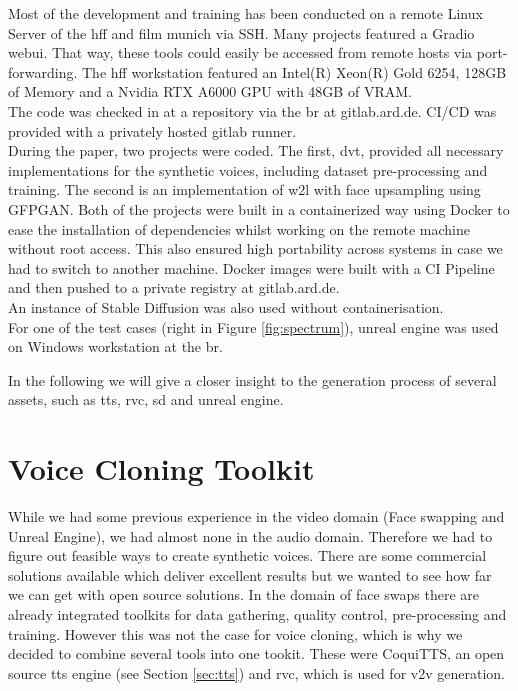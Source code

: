 \documentclass[
  a4paper,  %
  twoside,  %
  bibliography=totoc,
  headsepline,
  cleardoublepage=empty,
  parskip=half,
  draft=false
]{scrbook}
\begin{document}
Most of the development and training has been conducted on a remote Linux Server of the \gls{hff} and film munich via SSH. Many projects featured a Gradio webui. That way, these tools could easily be accessed from remote hosts via port-forwarding. The \gls{hff} workstation featured an Intel(R) Xeon(R) Gold 6254, 128GB of Memory and a Nvidia RTX A6000 GPU with 48GB of VRAM. \\
The code was checked in at a repository via the \gls{br} at gitlab.ard.de. CI/CD was provided with a privately hosted gitlab runner. \\
During the paper, two projects were coded. The first, \gls{dvt}, provided all necessary implementations for the synthetic voices, including dataset pre-processing and training. The second is an implementation of \gls{w2l} with face upsampling using GFPGAN. Both of the projects were built in a containerized way using Docker to ease the installation of dependencies whilst working on the remote machine without root access. This also ensured high portability across systems in case we had to switch to another machine. Docker images were built with a CI Pipeline and then pushed to a private registry at gitlab.ard.de. \\
An instance of Stable Diffusion was also used without containerisation.  \\
For one of the test cases (right in Figure \ref{fig:spectrum}), unreal engine was used on Windows workstation at the \gls{br}.

In the following we will give a closer insight to the generation process of several assets, such as \gls{tts}, \gls{rvc}, \gls{sd} and unreal engine.

\section{Voice Cloning Toolkit}
\label{sec:dvt}
While we had some previous experience in the video domain (Face swapping and Unreal Engine), we had almost none in the audio domain. Therefore we had to figure out feasible ways to create synthetic voices. There are some commercial solutions available which deliver excellent results but we wanted to see how far we can get with open source solutions. In the domain of face swaps there are already integrated toolkits for data gathering, quality control, pre-processing and training. However this was not the case for voice cloning, which is why we decided to combine several tools into one tookit. These were CoquiTTS, an open source \gls{tts} engine (see Section \ref{sec:tts}) and \gls{rvc}, which is used for \gls{v2v} generation. 
\end{document}
